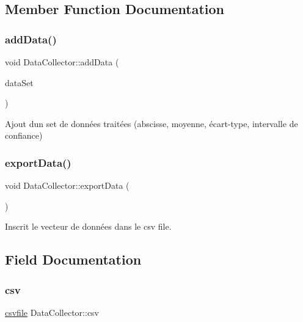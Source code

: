 \subsection{Member Function Documentation}
\mbox{\label{classDataCollector_ac0d50d38e3a5107541f929d4ea3a8cb5}} 
\subsubsection{\texorpdfstring{add\+Data()}{addData()}}
{\footnotesize\ttfamily void Data\+Collector\+::add\+Data (\begin{DoxyParamCaption}\item[{\hyperlink{classDataSet}{Data\+Set}}]{data\+Set }\end{DoxyParamCaption})}



Ajout d\textquotesingle{}un set de données traitées (abscisse, moyenne, écart-\/type, intervalle de confiance) 

\mbox{\label{classDataCollector_a6af99e22f24d045d607cb708866b9ce2}} 
\subsubsection{\texorpdfstring{export\+Data()}{exportData()}}
{\footnotesize\ttfamily void Data\+Collector\+::export\+Data (\begin{DoxyParamCaption}{ }\end{DoxyParamCaption})}



Inscrit le vecteur de données dans le csv file. 



\subsection{Field Documentation}
\mbox{\label{classDataCollector_a8150de03c388af2d36cfb8f15cd28189}} 
\subsubsection{\texorpdfstring{csv}{csv}}
{\footnotesize\ttfamily \hyperlink{classcsvfile}{csvfile} Data\+Collector\+::csv\hspace{0.3cm}{\ttfamily [private]}}

